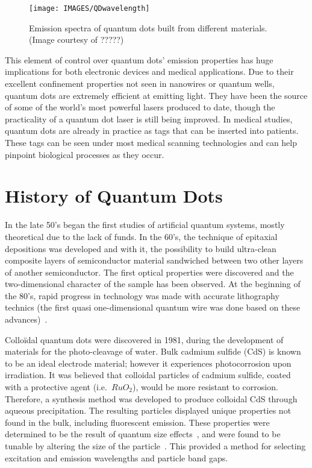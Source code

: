 \begin{figure}
 \centering
 \texttt{[image: IMAGES/QDwavelength]}
 \caption{Emission spectra of quantum dots built from different materials. (Image courtesy of ?????)}
 \label{fig:QDwavelength}
\end{figure}

This element of control over quantum dots' emission properties has huge implications for both electronic devices and medical applications.
Due to their excellent confinement properties not seen in nanowires or quantum wells, quantum dots are extremely efficient at emitting light. They have been the source of some of the world's most powerful lasers produced to date, though the practicality of a quantum dot laser is still being improved.  In medical studies, quantum dots are already in practice as tags that can be inserted into patients. These tags can be seen under most medical scanning technologies and can help pinpoint biological processes as they occur.




\section{History of Quantum Dots}
\label{sec:history}

In the late 50's began the first studies of artificial quantum systems, mostly theoretical due to the lack of funds.
In the 60's, the technique of epitaxial depositions was developed and with it, the possibility to build ultra-clean composite layers of semiconductor material sandwiched between two other layers of another semiconductor. The first optical properties were discovered and the two-dimensional character of the sample has been observed.
At the beginning of the 80's, rapid progress in technology was made with accurate lithography technics (the first quasi one-dimensional quantum wire was done based on these advances)~\cite{Heinzel2003}. 

Collo\"idal quantum dots were discovered in 1981, during the development of materials for the photo-cleavage of water.
Bulk cadmium sulfide (CdS) is known to be an ideal electrode material; however it experiences photocorrosion upon irradiation. It was believed that colloidal particles of cadmium sulfide, coated with a protective agent (i.e.\ $RuO_2$), would be more resistant to corrosion. Therefore, a synthesis method was developed to produce colloidal CdS through aqueous precipitation. The resulting particles displayed unique properties not found in the bulk, including fluorescent emission. These properties were determined to be the result of quantum size effects~\cite{Kalyanasundaram1981}, and were found to be tunable by altering the size of the particle~\cite{Rossetti1983}. This provided a method for selecting excitation and emission wavelengths and particle band gaps. 


